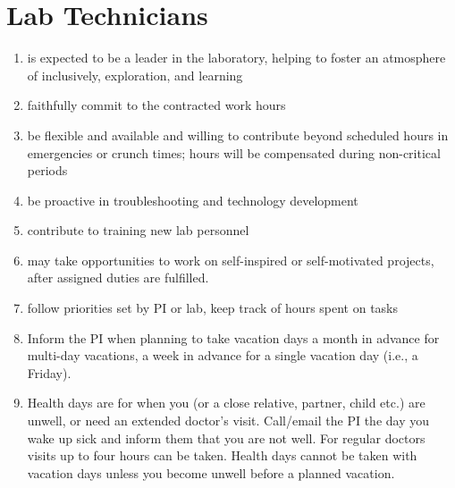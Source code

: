 \documentclass[12pt]{article}
\begin{document}
\section{Lab Technicians}
\begin{enumerate}
\item is expected to be a leader in the laboratory, helping to foster
  an atmosphere of inclusively, exploration, and learning
\item faithfully commit to the contracted work hours
\item be flexible and available and willing to contribute beyond
  scheduled hours in emergencies or crunch times; hours will be
  compensated during non-critical periods
\item be proactive in troubleshooting and technology development
\item contribute to training new lab personnel
\item may take opportunities to work on self-inspired or self-motivated
  projects, after assigned duties are fulfilled.
\item follow priorities set by PI or lab, keep track of hours spent on
  tasks
\item Inform the PI when planning to take vacation days a month in
  advance for multi-day vacations, a week in advance for a single
  vacation day (i.e., a Friday).
\item Health days are for when you (or a close relative, partner,
  child etc.) are unwell, or need an extended doctor's
  visit. Call/email the PI the day you wake up sick and inform them
  that you are not well. For regular doctors visits up to four hours
  can be taken. Health days cannot be taken with vacation days unless
  you become unwell before a planned vacation.
\end{enumerate}
\end{document}
